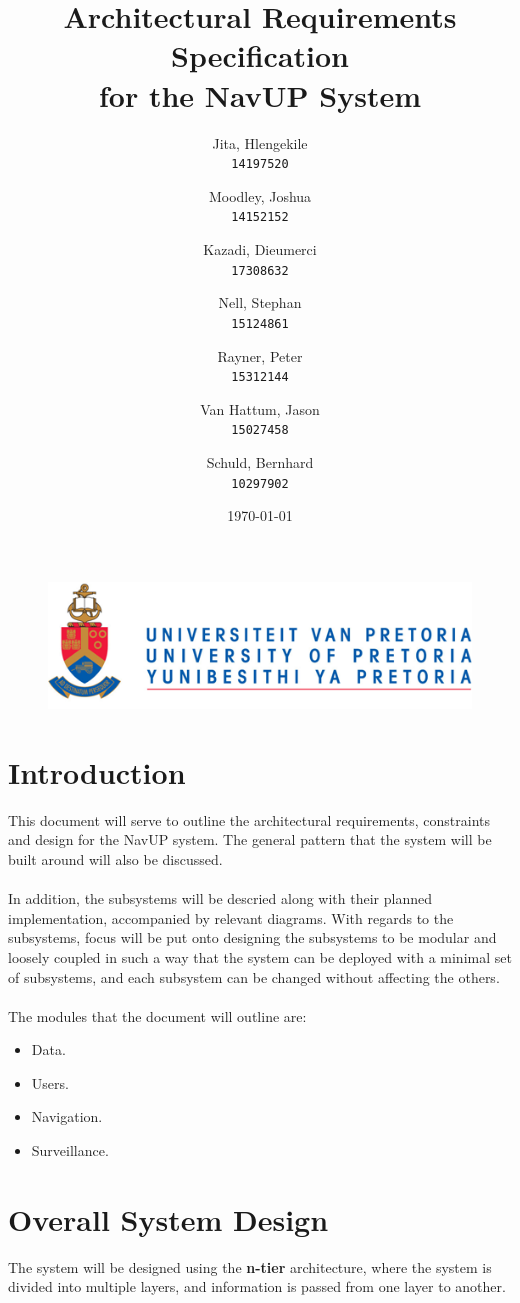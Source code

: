 \documentclass[english]{article}
\author{
	Jita, Hlengekile\\
	\texttt{14197520}
	\and
	Moodley, Joshua\\
	\texttt{14152152}
	\and
	Kazadi, Dieumerci\\
	\texttt{17308632}
	\and
	Nell, Stephan\\
	\texttt{15124861}
	\and
	Rayner, Peter\\
	\texttt{15312144}
	\and
	Van Hattum, Jason\\
	\texttt{15027458}
	\and
	Schuld, Bernhard\\
	\texttt{10297902}
}
\title{Architectural Requirements Specification\\
	for the NavUP System\\
	}
\date{\today}
\begin{document}
    \fboxsep=2mm

	\maketitle
	\begin{figure}[!t]
		\includegraphics{up_logo.png}
	\end{figure}
	\newpage

	\tableofcontents
	\newpage


	\section{Introduction}
		This document will serve to outline the architectural requirements, constraints and design for the NavUP system. The general pattern that the system will be built around will also be discussed.\\
        \\
		In addition, the subsystems will be descried along with their planned implementation, accompanied by relevant diagrams. With regards to the subsystems, focus will be put onto designing the subsystems to be modular and loosely coupled in such a way that the system can be deployed with a minimal set of subsystems, and each subsystem can be changed without affecting the others.\\
		\\
		The modules that the document will outline are:
		\begin{itemize}
		    \item Data.
		    \item Users.
		    \item Navigation.
		    \item Surveillance.
		\end{itemize}

	\section{Overall System Design}
	    The system will be designed using the \textbf{n-tier} architecture, where the system is divided into multiple layers, and information is passed from one layer to another.
\end{document}
